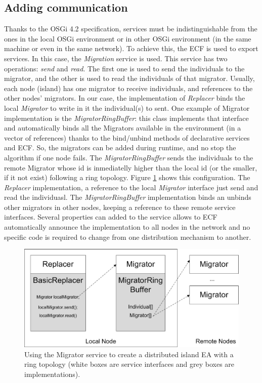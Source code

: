 \documentclass{sig-alternate}
\begin{document}
\subsection{Adding communication}
Thanks to the OSGi 4.2 specification, services must be indistinguishable from the ones in the local OSGi environment or in other OSGi environment (in the same machine or even in the same network). To achieve this, the ECF is used to export services. In this case, the {\em Migration} service is used. This service has two operations: {\em send} and {\em read}. The first one is used to send the individuals to the migrator, and the other is used to read the individuals of that migrator. Usually, each node (island) has one migrator to receive individuals, and references to the other nodes' migrators. In our case, the implementation of {\em Replacer} binds the local {\em Migrator} to write in it the individual(s) to sent. One example of Migrator implementation is the {\em MigratorRingBuffer}: this class implements that interface and automatically binds all the Migrators available in the environment (in a vector of references) thanks to the bind/unbind methods of declarative services and ECF. So, the migrators can be added during runtime, and no stop the algorithm if one node fails.  The {\em MigratorRingBuffer} sends the individuals to the remote Migrator whose id is inmediatelly higher than the local id (or the smaller, if it not exist) following a ring topology. Figure \ref{MIGRATOR} shows this configuration. The {\em Replacer} implementation, a reference to the local {\em Migrator} interface just send and read the individuasl. The {\em MigratorRingBuffer} implementation binds an unbinds other migrators in other nodes, keeping a reference to these remote service interfaces. Several properties can added to the service allows to ECF automatically announce the implementation to all nodes in the network and no specific code is required to change from one distribution mechanism to another. 

\begin{figure}[ht] 
\begin{center} 
\includegraphics[scale=0.7]{images/migrator.eps}
\end{center} 
\caption{Using the Migrator service to create a distributed island EA with a ring topology (white boxes are service interfaces and grey boxes are implementations).} 
\label{MIGRATOR} 
\end{figure} 
\end{document}
